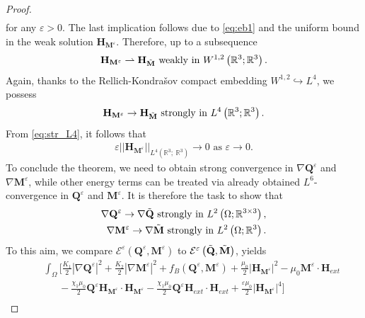 \documentclass{article}
\def\Qvec{\mathbf{Q}}
\def \Mvec{\mathbf{M}}
\def\Hvec{\mathbf{H}}
\begin{document}
\begin{proof}
\begin{eqnarray}
\end{eqnarray}
for any $\varepsilon>0$. The last implication follows due to \eqref{eq:eb1} and the uniform bound in the weak solution $\Hvec_{\Mvec^{\varepsilon}}$.
Therefore, up to a subsequence
\begin{eqnarray}
\Hvec_{\Mvec^{\varepsilon}}\rightharpoonup\Hvec_{\Tilde{\Mvec}} \mbox{ weakly in } W^{1,2}\left(\mathbb R^3; \mathbb R^3\right).
\end{eqnarray}
Again, thanks to the Rellich-Kondra\v{s}ov compact embedding $W^{1,2}\hookrightarrow L^4$, %
we possess
\begin{eqnarray}
\Hvec_{\Mvec^{\varepsilon}}\rightarrow\Hvec_{\Tilde{\Mvec}} \mbox{ strongly in } L^4\left(\mathbb R^3; \mathbb R^3\right).\label{eq:str_L4}
\end{eqnarray}
From \eqref{eq:str_L4}, it follows that
\begin{eqnarray}
\varepsilon||\Hvec_{\Mvec^{\varepsilon}}||_{L^4\left(\mathbb R^3;~\mathbb R^3\right)}\rightarrow 0 \mbox{ as } \varepsilon\rightarrow 0.\label{Str-eq1}
\end{eqnarray}
To conclude the theorem, we need to obtain strong convergence in $\nabla\Qvec^{\varepsilon}$ and $\nabla\Mvec^{\varepsilon}$, while other energy terms can be treated via already obtained $L^6$-convergence in $\Qvec^{\varepsilon}$ and $\Mvec^{\varepsilon}$. It is therefore the task to show that
\begin{eqnarray}
\nabla\Qvec^{\varepsilon}\rightarrow\nabla\Tilde{\Qvec} \mbox{ strongly in } L^2\left(\Omega; \mathbb R^{3\times 3}\right),\label{str-Q}\\
\nabla\Mvec^{\varepsilon}\rightarrow\nabla\Tilde{\Mvec} \mbox{ strongly in } L^2\left(\Omega; \mathbb R^3\right)\label{str-M}.
\end{eqnarray}
To this aim, we compare $\mathcal{E}^{\varepsilon}\left(\Qvec^{\varepsilon}, \Mvec^{\varepsilon}\right)$ to $\mathcal{E}^{\varepsilon}\left(\Tilde{\Qvec}, \Tilde{\Mvec}\right)$, yields
\begin{eqnarray}
& &\int_{\Omega} \biggl[\frac{K_1}{2}|\nabla \Qvec^{\varepsilon}|^2 + \frac{K_2}{2}|\nabla \Mvec^{\varepsilon}|^2 + f_B\left(\Qvec^{\varepsilon}, \Mvec^{\varepsilon}\right) + \frac{\mu_0}{2}|\Hvec_{\Mvec^{\varepsilon}}|^2 - \mu_0\Mvec^{\varepsilon}\cdot \Hvec_{ext}\nonumber\\
& &~~~~~~~- \frac{\chi_1\mu_0}{2}\Qvec^{\varepsilon}\Hvec_{\Mvec^{\varepsilon}}\cdot\Hvec_{\Mvec^{\varepsilon}} - \frac{\chi_1\mu_0}{2}\Qvec^{\varepsilon}\Hvec_{ext}\cdot\Hvec_{ext}+\frac{\varepsilon\mu_0}{2}|\Hvec_{\Mvec^{\varepsilon}}|^4\biggr]\nonumber\\

\end{eqnarray}
\end{proof}
\end{document}
